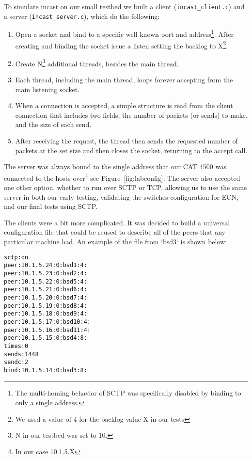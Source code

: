 \documentclass[12pt]{article}
\begin{document}
To simulate incast on our small testbed we built a client
(\texttt{incast\_client.c}) and a server (\texttt{incast\_server.c}), 
which  do the following:
\begin{enumerate}

\item Open a socket and bind to a specific well known port and address\footnote{The multi-homing
behavior of SCTP was specifically disabled by binding to only a single address.}. After creating and
binding the socket issue a listen setting the backlog to X\footnote{We used a value of 4 for the backlog value X in our tests}.

\item Create N\footnote{N in our testbed was set to 10.} additional threads, besides the main thread.

\item Each thread, including the main thread, loops forever accepting from the main listening socket.

\item When a connection is accepted, a simple structure is read from the client connection that includes two fields, the
number of packets (or sends) to make, and the size of each send.

\item After receiving the request, the thread then sends the requested number of packets at the set
size and then closes the socket, returning to the accept call.

\end{enumerate}

The server
was always bound to the single address that our CAT 4500 was connected to the hosts over\footnote{In our case 10.1.5.X}
see Figure~\ref{fig:labconfig}.
The server also accepted one other option, whether to run over SCTP or
TCP, allowing us to use
the same server in both our early testing, validating the switches configuration for ECN, and our final tests
using SCTP.

The clients were a bit more complicated. It was decided to build a universal 
configuration file that could be reused to describe all of the peers that any
particular machine had. An example of the file from `bsd3` is shown below:

\begin{verbatim}
sctp:on
peer:10.1.5.24:0:bsd1:4:
peer:10.1.5.23:0:bsd2:4:
peer:10.1.5.22:0:bsd5:4:
peer:10.1.5.21:0:bsd6:4:
peer:10.1.5.20:0:bsd7:4:
peer:10.1.5.19:0:bsd8:4:
peer:10.1.5.18:0:bsd9:4:
peer:10.1.5.17:0:bsd10:4:
peer:10.1.5.16:0:bsd11:4:
peer:10.1.5.15:0:bsd4:8:
times:0
sends:1448
sendc:2
bind:10.1.5.14:0:bsd3:8:
\end{verbatim}
\end{document}
